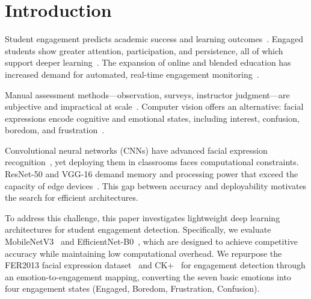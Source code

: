 \documentclass[apajournal,article,submit,pdftex,moreauthors]{Definitions/mdpi}
\begin{document}
\section{Introduction}

Student engagement predicts academic success and learning outcomes~\citep{fredricks2004school}. Engaged students show greater attention, participation, and persistence, all of which support deeper learning~\citep{dixson2015measuring}. The expansion of online and blended education has increased demand for automated, real-time engagement monitoring~\citep{mandia2024deep}.

Manual assessment methods---observation, surveys, instructor judgment---are subjective and impractical at scale~\citep{whitehill2014faces}. Computer vision offers an alternative: facial expressions encode cognitive and emotional states, including interest, confusion, boredom, and frustration~\cite{kleinsmith2013affective,jampour2022multiview}.

Convolutional neural networks (CNNs) have advanced facial expression recognition~\citep{bengio2013representation}, yet deploying them in classrooms faces computational constraints. ResNet-50 and VGG-16 demand memory and processing power that exceed the capacity of edge devices~\citep{howard2017mobilenets}. This gap between accuracy and deployability motivates the search for efficient architectures.

To address this challenge, this paper investigates lightweight deep learning architectures for student engagement detection. Specifically, we evaluate MobileNetV3~\citep{howard2019mobilenetv3} and EfficientNet-B0~\citep{tan2019efficientnet}, which are designed to achieve competitive accuracy while maintaining low computational overhead. We repurpose the FER2013 facial expression dataset~\citep{goodfellow2013challenges} and CK+~\citep{lucey2010ck} for engagement detection through an emotion-to-engagement mapping, converting the seven basic emotions into four engagement states (Engaged, Boredom, Frustration, Confusion).
\end{document}

